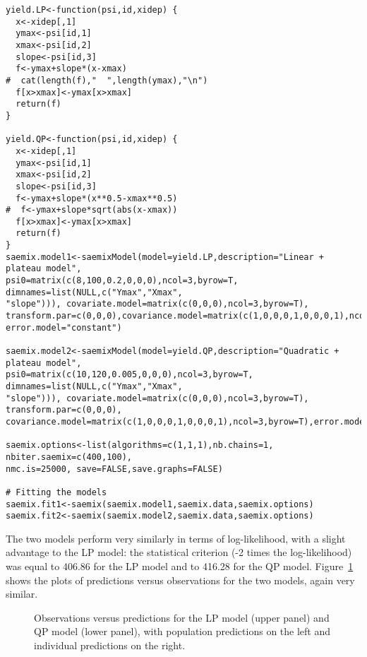 {\begin{verbatim}
yield.LP<-function(psi,id,xidep) {
  x<-xidep[,1]
  ymax<-psi[id,1]
  xmax<-psi[id,2]
  slope<-psi[id,3]
  f<-ymax+slope*(x-xmax)
#  cat(length(f),"  ",length(ymax),"\n")
  f[x>xmax]<-ymax[x>xmax]
  return(f)
}

yield.QP<-function(psi,id,xidep) {
  x<-xidep[,1]
  ymax<-psi[id,1]
  xmax<-psi[id,2]
  slope<-psi[id,3]
  f<-ymax+slope*(x**0.5-xmax**0.5)
#  f<-ymax+slope*sqrt(abs(x-xmax))
  f[x>xmax]<-ymax[x>xmax]
  return(f)
}
saemix.model1<-saemixModel(model=yield.LP,description="Linear + plateau model",  
psi0=matrix(c(8,100,0.2,0,0,0),ncol=3,byrow=T, dimnames=list(NULL,c("Ymax","Xmax", 
"slope"))), covariate.model=matrix(c(0,0,0),ncol=3,byrow=T), 
transform.par=c(0,0,0),covariance.model=matrix(c(1,0,0,0,1,0,0,0,1),ncol=3,byrow=T), 
error.model="constant")

saemix.model2<-saemixModel(model=yield.QP,description="Quadratic + plateau model", 
psi0=matrix(c(10,120,0.005,0,0,0),ncol=3,byrow=T, dimnames=list(NULL,c("Ymax","Xmax", 
"slope"))), covariate.model=matrix(c(0,0,0),ncol=3,byrow=T), transform.par=c(0,0,0), 
covariance.model=matrix(c(1,0,0,0,1,0,0,0,1),ncol=3,byrow=T),error.model="constant")

saemix.options<-list(algorithms=c(1,1,1),nb.chains=1, nbiter.saemix=c(400,100), 
nmc.is=25000, save=FALSE,save.graphs=FALSE)

# Fitting the models
saemix.fit1<-saemix(saemix.model1,saemix.data,saemix.options)
saemix.fit2<-saemix(saemix.model2,saemix.data,saemix.options)
\end{verbatim}
The two models perform very similarly in terms of log-likelihood, with a slight advantage to the LP model: the statistical criterion (-2 times the log-likelihood) was equal to 406.86 for the LP model and to 416.28 for the QP model. Figure~\ref{fig:yielddiagnos} shows the plots of predictions versus observations for the two models, again very similar.

\newpage
\begin{figure}[!h]
\begin{center}
\par \kern -0.5cm
\end{center}
\par \kern -0.5cm
\caption{Observations versus predictions for the LP model (upper panel) and QP model (lower panel), with population predictions on the left and individual predictions on the right.} \label{fig:yielddiagnos}
\end{figure}

}
